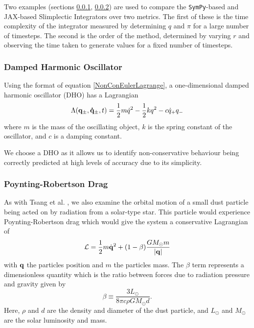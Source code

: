 \documentclass[10pt]{iopart}
\begin{document}
Two examples (sections \ref{DHO}, \ref{PRD}) are used to compare the \texttt{SymPy}-based and JAX-based Slimplectic Integrators over two metrics. The first of these is the time complexity of the integrator measured by determining $q$ and $\pi$ for a large number of timesteps. The second is the order of the method, determined by varying $r$ and observing the time taken to generate values for a fixed number of timesteps.
\subsubsection{Damped Harmonic Oscillator \\}
\label{DHO}
Using the format of equation \ref{NonConEulerLagrange}, a one-dimensional damped harmonic oscillator (DHO) has a Lagrangian
\begin{equation}
\label{DHOeqn}
	\Lambda(\bold{q_{\pm},\dot{q}_{\pm}},t) = \frac{1}{2}m\dot{q}^2 - \frac{1}{2}kq^2 - c\dot{q}_+q_-
\end{equation}
where $m$ is the mass of the oscillating object, $k$ is the spring constant of the oscillator, and $c$ is a damping constant.  

We choose a DHO as it allows us to identify non-conservative behaviour being correctly predicted at high levels of accuracy due to its simplicity. 
\subsubsection{Poynting-Robertson Drag \\}
\label{PRD}
As with Tsang et al. \cite{Tsang_Slimplectic}, we also examine the orbital motion of a small dust particle being acted on by radiation from a solar-type star. This particle would experience Poynting-Robertson drag \cite{Poynting-Robertson} which would give the system a conservative Lagrangian of 
\begin{equation}
	\mathcal L = \frac{1}{2}m\dot{\bold{q}}^2 + (1-\beta)\frac{GM_\odot m}{|\bold{q}|}
\end{equation} 
with $\bold{q}$ the particles position and $m$ the particles mass. The $\beta$ term represents a dimensionless quantity which is the ratio between forces due to radiation pressure and gravity given by 
\begin{equation}
	\beta\equiv\frac{3L_\odot}{8\pi c\rho GM_\odot d}.
\end{equation}
Here, $\rho$ and $d$ are the density and diameter of the dust particle, and $L_\odot$ and $M_\odot$ are the solar luminosity and mass.
\end{document}
